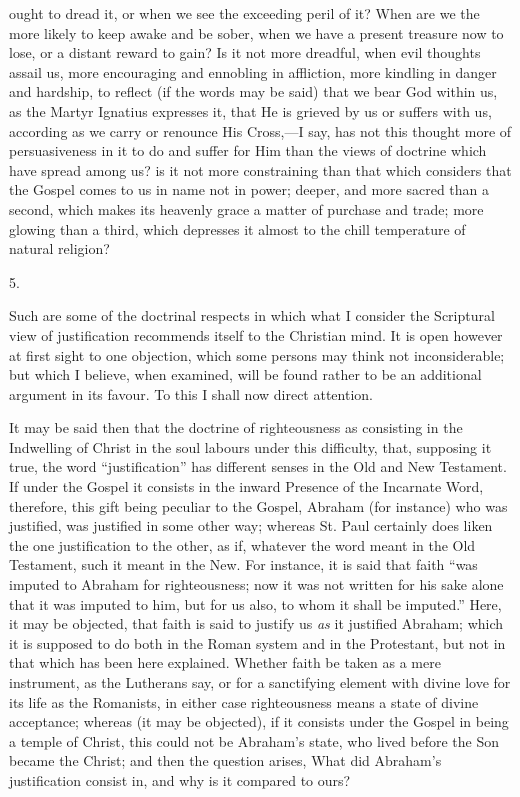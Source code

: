 ought to dread it, or when we see the exceeding peril of it? When are
we the more likely to keep awake and be sober, when we have a present
treasure now to lose, or a distant reward to gain? Is it not more
dreadful, when evil thoughts assail us, more encouraging and ennobling
in affliction, more kindling in danger and hardship, to reflect (if
the words may be said) that we bear God within us, as the Martyr
Ignatius expresses it, that He is grieved by us or suffers with us,
according as we carry or renounce His Cross,—I say, has not this
thought more of persuasiveness in it to do and suffer for Him than the
views of doctrine which have spread among us? is it not more
constraining than that which considers that the Gospel comes to us in
name not in power; deeper, and more sacred than a second, which makes
its heavenly grace a matter of purchase and trade; more glowing than a
third, which depresses it almost to the chill temperature of natural
religion?

5.

Such are some of the doctrinal respects in which what I consider
the Scriptural view of justification recommends itself to the
Christian mind. It is open however at first sight to one objection,
which some persons may think not inconsiderable; but which I believe,
when examined, will be found rather to be an additional argument in
its favour. To this I shall now direct attention.

It may be said then that the doctrine of righteousness as
consisting in the Indwelling of Christ in the soul labours under this
difficulty, that, supposing it true, the word
``justification'' has different senses in the Old and New
Testament. If under the Gospel it consists in the inward Presence of
the Incarnate Word, therefore, this gift being peculiar to the Gospel,
Abraham (for instance) who was justified, was justified in some other
way; whereas St. Paul certainly does liken the one justification to
the other, as if, whatever the word meant in the Old Testament, such
it meant in the New. For instance, it is said that faith ``was
imputed to Abraham for righteousness; now it was not written for his
sake alone that it was imputed to him, but for us also, to whom it
shall be imputed.'' Here, it may be objected, that faith is said
to justify us \emph{as} it justified Abraham; which it is supposed to
do both in the Roman system and in the Protestant, but not in that
which has been here explained. Whether faith be taken as a mere
instrument, as the Lutherans say, or for a sanctifying element with
divine love for its life as the Romanists, in either case
righteousness means a state of divine acceptance; whereas (it may be
objected), if it consists under the Gospel in being a temple of
Christ, this could not be Abraham's state, who lived before the Son
became the Christ; and then the question arises, What did Abraham's
justification consist in, and why is it compared to ours?

